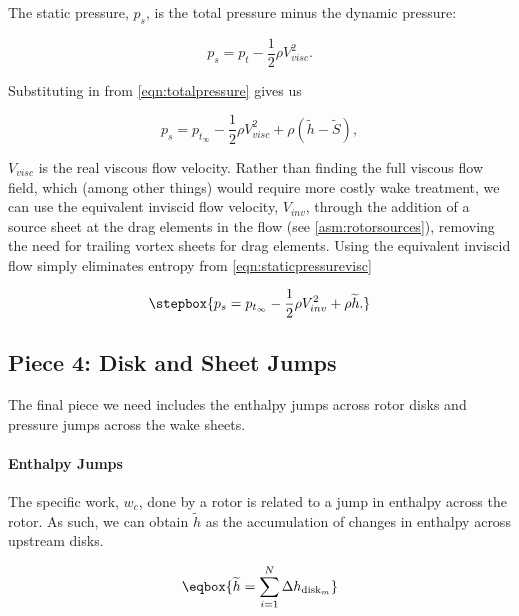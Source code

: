 The static pressure, \(p_s\), is the total pressure minus the dynamic pressure:

\begin{equation}
    \label{eqn:bernoulli}
    p_s = p_{t} - \frac{1}{2}\rho V_{visc}^2.
\end{equation}

\noindent Substituting in from \cref{eqn:totalpressure} gives us

\begin{equation}
    \label{eqn:staticpressurevisc}
    p_s = p_{t_\infty} - \frac{1}{2}\rho V_{visc}^2 + \rho\left(\widetilde{h}-\widetilde{S} \right),
\end{equation}

\where \(V_{visc}\) is the real viscous flow velocity.
%
Rather than finding the full viscous flow field, which (among other things) would require more costly wake treatment,
we can use the equivalent inviscid flow velocity, \(V_{inv}\),
through the addition of a source sheet at the drag elements in the flow (see \cref{asm:rotorsources}),
removing the need for trailing vortex sheets for drag elements.
%
%
Using the equivalent inviscid flow simply eliminates entropy from \cref{eqn:staticpressurevisc}

\begin{equation}
    \label{eqn:staticpressure}
    \stepbox{
    p_s = p_{t_\infty} - \frac{1}{2}\rho V_{inv}^2 + \rho \widetilde{h}.
}
\end{equation}


\subsection{Piece 4: Disk and Sheet Jumps}
\label{ssec:diskjumps}

The final piece we need includes the enthalpy jumps across rotor disks and pressure jumps across the wake sheets.

\paragraph{Enthalpy Jumps}

The specific work, \(w_c\), done by a rotor is related to a jump in enthalpy across the rotor.
%
As such, we can obtain \(\widetilde{h}\) as the accumulation of changes in enthalpy across upstream disks.

\begin{equation}
    \label{eqn:hjump}
    \eqbox{\widetilde{h} = \sum_{i=1}^N \Delta h_{\text{disk}_m}}
\end{equation}

